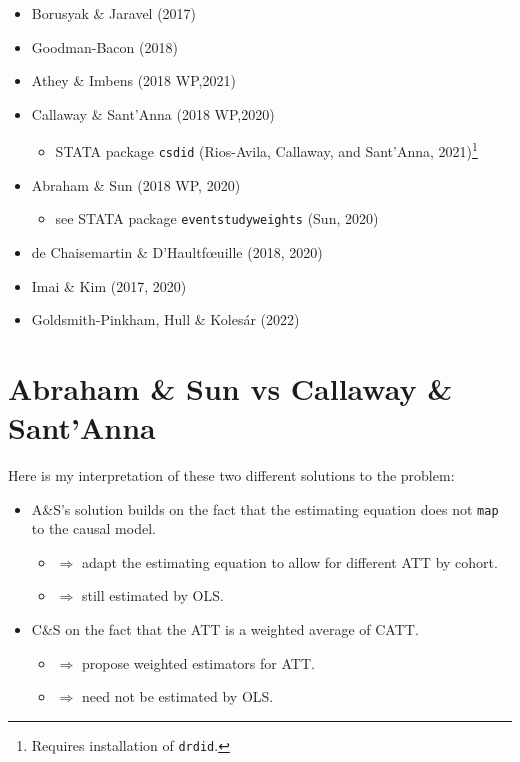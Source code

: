 \documentclass[
  letterpaper,
  DIV=11,
  numbers=noendperiod]{scrreprt}
\providecommand{\tightlist}{%
  \setlength{\itemsep}{0pt}\setlength{\parskip}{0pt}}\usepackage{longtable,booktabs,array}
\theoremstyle{definition}
\theoremstyle{remark}
\begin{document}
\begin{itemize}
\tightlist
\item
  Borusyak \& Jaravel (2017)
\item
  Goodman-Bacon (2018)
\item
  Athey \& Imbens (2018 WP,2021)
\item
  Callaway \& Sant'Anna (2018 WP,2020)

  \begin{itemize}
  \tightlist
  \item
    STATA package \texttt{csdid} (Rios-Avila, Callaway, and Sant'Anna,
    2021)\footnote{Requires installation of \texttt{drdid}.}
  \end{itemize}
\item
  Abraham \& Sun (2018 WP, 2020)

  \begin{itemize}
  \tightlist
  \item
    see STATA package \texttt{eventstudyweights} (Sun, 2020)
  \end{itemize}
\item
  de Chaisemartin \& D'Haultfœuille (2018, 2020)
\item
  Imai \& Kim (2017, 2020)
\item
  Goldsmith-Pinkham, Hull \& Kolesár (2022)
\end{itemize}

\hypertarget{abraham-sun-vs-callaway-santanna}{%
\section{Abraham \& Sun vs Callaway \&
Sant'Anna}\label{abraham-sun-vs-callaway-santanna}}

Here is my interpretation of these two different solutions to the
problem:

\begin{itemize}
\tightlist
\item
  A\&S's solution builds on the fact that the estimating equation does
  not \texttt{map} to the causal model.

  \begin{itemize}
  \tightlist
  \item
    \(\Rightarrow\) adapt the estimating equation to allow for different
    ATT by cohort.
  \item
    \(\Rightarrow\) still estimated by OLS.
  \end{itemize}
\item
  C\&S on the fact that the ATT is a weighted average of CATT.

  \begin{itemize}
  \tightlist
  \item
    \(\Rightarrow\) propose weighted estimators for ATT.
  \item
    \(\Rightarrow\) need not be estimated by OLS.
  \end{itemize}
\end{itemize}
\end{document}
